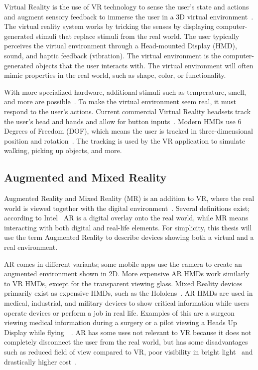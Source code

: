 \documentclass[a4paper]{report}
\begin{document}
Virtual Reality is the use of VR technology to sense the user's state and actions and augment sensory feedback to immerse the user in a 3D virtual environment~\cite{mihelj_virtual_2014}.
The virtual reality system works by tricking the senses by displaying computer-generated stimuli that replace stimuli from the real world. 
The user typically perceives the virtual environment through a Head-mounted Display (HMD), sound, and haptic feedback (vibration).
The virtual environment is the computer-generated objects that the user interacts with. The virtual environment will often mimic properties in the real world, such as shape, color, or functionality.

With more specialized hardware, additional stimuli such as temperature, smell, and more are possible~\cite{noauthor_feelreal_nodate}.
To make the virtual environment seem real, it must respond to the user's actions. Current commercial Virtual Reality headsets track the user's head and hands and allow for button inputs~\cite{noauthor_oculus_nodate}. Modern HMDs use 6 Degrees of Freedom (DOF), which means the user is tracked in three-dimensional position and rotation~\cite{lang_introduction_2013}. The tracking is used by the VR application to simulate walking, picking up objects, and more.

\subsection{Augmented and Mixed Reality}
Augmented Reality and Mixed Reality (MR) is an addition to VR, where the real world is viewed together with the digital environment~\cite{hackett_three-dimensional_2016}. Several definitions exist; according to Intel~\cite{intel_virtual_nodate} AR is a digital overlay onto the real world, while MR means interacting with both digital and real-life elements.
For simplicity, this thesis will use the term Augmented Reality to describe devices showing both a virtual and a real environment.

AR comes in different variants; some mobile apps use the camera to create an augmented environment shown in 2D. More expensive AR HMDs work similarly to VR HMDs, except for the transparent viewing glass. Mixed Reality devices primarily exist as expensive HMDs, such as the Hololens~\cite{hololens_microsoft_nodate}.
AR HMDs are used in medical, industrial, and military devices to show critical information while users operate devices or perform a job in real life. Examples of this are a surgeon viewing medical information during a surgery or a pilot viewing a Heads Up Display while flying~\cite{mihelj_virtual_2014}~\cite{mertz_virtual_2019}.
AR has some uses not relevant to VR because it does not completely disconnect the user from the real world, but has some disadvantages such as reduced field of view compared to VR, poor visibility in bright light~\cite{hackett_three-dimensional_2016} and drastically higher cost~\cite{medical_holodeck_medicalholodeck_nodate}.
\end{document}
